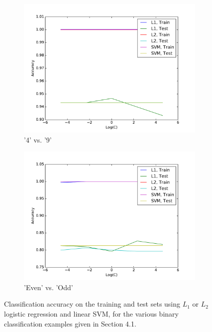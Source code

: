 \documentclass[10pt,psamsfonts]{amsart}
\theoremstyle{definition}
\theoremstyle{remark}
\numberwithin{equation}{section}
\begin{document}
\begin{figure}[t]
\begin{subfigure}[b]{0.23\textwidth}
		\includegraphics[width=\textwidth]{hw2_4-1_4v9.pdf}
		\caption{'4' vs. '9'}
	\end{subfigure}
	\begin{subfigure}[b]{0.23\textwidth}
		\includegraphics[width=\textwidth]{hw2_4-1_evo.pdf}
		\caption{'Even' vs. 'Odd'}
	\end{subfigure}
	\caption{Classification accuracy on the training and test sets using $L_1$ or $L_2$ logistic regression and linear SVM, for the various binary classification examples given in Section 4.1.}
\end{figure}
\end{document}
